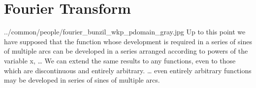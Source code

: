 
\chapter{Fourier Transform}
\label{app:fourier}

  {../common/people/fourier_bunzil_wkp_pdomain_gray.jpg}
  {%
  Up to this point we have supposed that the function
  whose development is required in a series of sines of multiple
  arcs can be developed in a series arranged according to powers
  of the variable x,
  \ldots
  We can extend the same results to any functions, even
  to those which are discontinuous and entirely arbitrary.
  \ldots
  even entirely arbitrary functions may be developed in series of sines
  of multiple arcs.
  }

